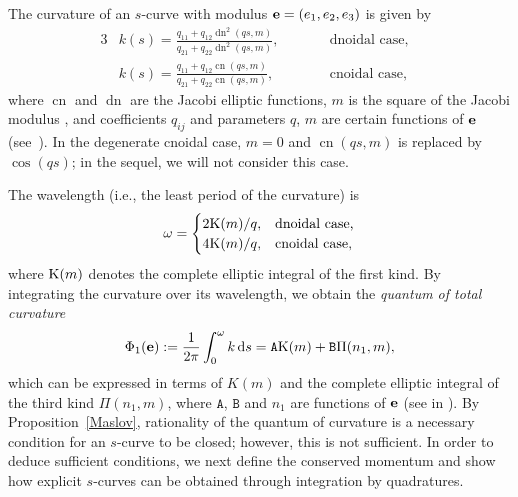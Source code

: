 \documentclass[pdftex]{sigma}
\newcommand\kk{k} %
\newcommand{\ds}{\,{\rm d}s}
\newcommand\be{{\bf e}}
\newcommand\cn{\operatorname{cn}}
\newcommand\dn{\operatorname{dn}}
\numberwithin{equation}{section}
\begin{document}
The curvature of an $s$-curve with modulus $\be=(e_1,e_2,e_3)$ is given by
\begin{alignat}{3}
&\kk(s)= \frac{q_{11}+q_{12}\dn^2(qs,m)}{q_{21}+q_{22}\dn^2(qs,m)}, \qquad&& \text{dnoidal case},& \nonumber\\
&\kk(s)= \frac{q_{11}+q_{12}\cn(qs,m)}{q_{21}+q_{22}\cn(qs,m)}, \qquad && \text{cnoidal case}, &\label{curvaturedn}
\end{alignat}
where $\cn$ and $\dn$ are the Jacobi elliptic functions, $m$ is the square of the Jacobi modulus \cite{Law},
and coefficients $q_{ij}$ and parameters $q$, $m$ are certain functions of $\be$ (see~\cite[formulas~(256.00) and~(259.00)]{BF}).
In the degenerate cnoidal case, $m=0$ and $\cn(q s,m)$ is replaced by $\cos(q s)$; in the sequel, we will not consider this case.

The wavelength (i.e., the least period of the curvature) is
\begin{equation}
\label{wl}\omega = \begin{cases}2{\rm K}(m)/{q}, &\text{dnoidal case,}\\
4{\rm K}(m)/{q}, & \text{cnoidal case,}\end{cases}
\end{equation}
where ${\rm K}(m)$ denotes the complete elliptic integral of the first kind. By integrating the curvature
over its wavelength, we obtain the {\it quantum of total curvature}
\begin{equation}\label{curvtot}\Phi_1(\be):=\frac{1}{2\pi}\int_0^{\omega} \kk \ds={\mathtt A}{\rm K}(m)+{\mathtt B}\Pi(n_1,m),
\end{equation}
which can be expressed in terms of $K(m)$ and the complete elliptic integral of the third kind $\Pi(n_1,m)$,
where ${\mathtt A}$, ${\mathtt B}$ and $n_1$ are functions of $\be$ (see in \cite[formulas~(340.03) and (341.03)]{BF}).
By Proposition~\ref{Maslov}, rationality of the quantum of curvature is a necessary condition for
an $s$-curve to be closed; however, this is not sufficient. In order to deduce sufficient conditions, we next define the conserved momentum and show how explicit $s$-curves can be obtained through integration by quadratures.
\end{document}
